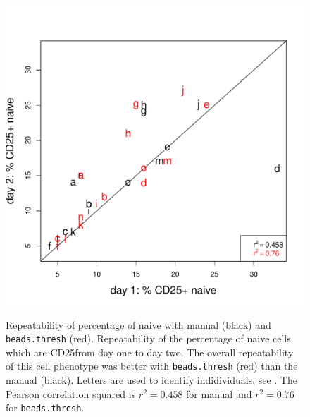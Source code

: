 
\begin{figure}
\centering
\begin{minipage}{.6\textwidth}
\includegraphics[width=\linewidth]{figures/repeatability-cd25pos-naive.pdf}
\end{minipage}
{ Repeatability of percentage of naive \positive with manual (black) and \texttt{beads.thresh} (red). }
{
Repeatability of the percentage of naive cells which are CD25\positive from day one to day two.
The overall repeatability of this cell phenotype was better with \texttt{beads.thresh} (red)
than the manual (black).
Letters are used to identify indidividuals, see .
The Pearson correlation squared is $r^2=0.458$ for manual and $r^2=0.76$ for \texttt{beads.thresh}.
}
\end{figure}



